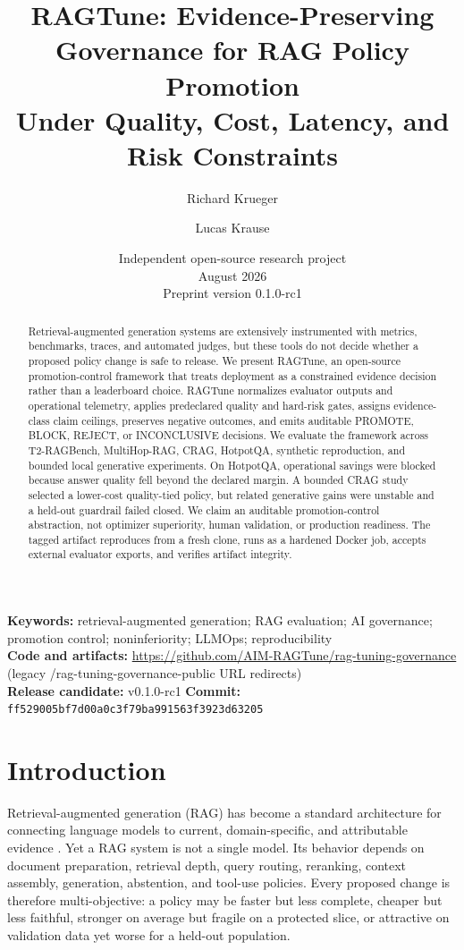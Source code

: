 \documentclass[11pt]{article}
\title{RAGTune: Evidence-Preserving Governance for RAG Policy Promotion\\Under Quality, Cost, Latency, and Risk Constraints}
\author{Richard Krueger \and Lucas Krause}
\date{Independent open-source research project \\ August 2026 \\ Preprint version 0.1.0-rc1}
\begin{document}
\maketitle
\nocite{ref1,ref2,ref3,ref4,ref5,ref6,ref7,ref8,ref9,ref10,ref11,ref12,ref13,ref14,ref15,ref16,ref17,ref18,ref19,ref20}
\begin{abstract}
Retrieval-augmented generation systems are extensively instrumented with metrics, benchmarks, traces, and automated judges, but these tools do not decide whether a proposed policy change is safe to release. We present RAGTune, an open-source promotion-control framework that treats deployment as a constrained evidence decision rather than a leaderboard choice. RAGTune normalizes evaluator outputs and operational telemetry, applies predeclared quality and hard-risk gates, assigns evidence-class claim ceilings, preserves negative outcomes, and emits auditable PROMOTE, BLOCK, REJECT, or INCONCLUSIVE decisions. We evaluate the framework across T2-RAGBench, MultiHop-RAG, CRAG, HotpotQA, synthetic reproduction, and bounded local generative experiments. On HotpotQA, operational savings were blocked because answer quality fell beyond the declared margin. A bounded CRAG study selected a lower-cost quality-tied policy, but related generative gains were unstable and a held-out guardrail failed closed. We claim an auditable promotion-control abstraction, not optimizer superiority, human validation, or production readiness. The tagged artifact reproduces from a fresh clone, runs as a hardened Docker job, accepts external evaluator exports, and verifies artifact integrity.
\end{abstract}

\noindent\textbf{Keywords:} retrieval-augmented generation; RAG evaluation; AI governance; promotion control; noninferiority; LLMOps; reproducibility\\
\textbf{Code and artifacts:} \url{https://github.com/AIM-RAGTune/rag-tuning-governance} (legacy /rag-tuning-governance-public URL redirects)\\
\textbf{Release candidate:} v0.1.0-rc1 \quad \textbf{Commit:} \texttt{ff529005bf7d00a0c3f79ba991563f3923d63205}

\section{Introduction}
Retrieval-augmented generation (RAG) has become a standard architecture for connecting language models to current, domain-specific, and attributable evidence \cite{ref1,ref2}. Yet a RAG system is not a single model. Its behavior depends on document preparation, retrieval depth, query routing, reranking, context assembly, generation, abstention, and tool-use policies. Every proposed change is therefore multi-objective: a policy may be faster but less complete, cheaper but less faithful, stronger on average but fragile on a protected slice, or attractive on validation data yet worse for a held-out population.
\end{document}

